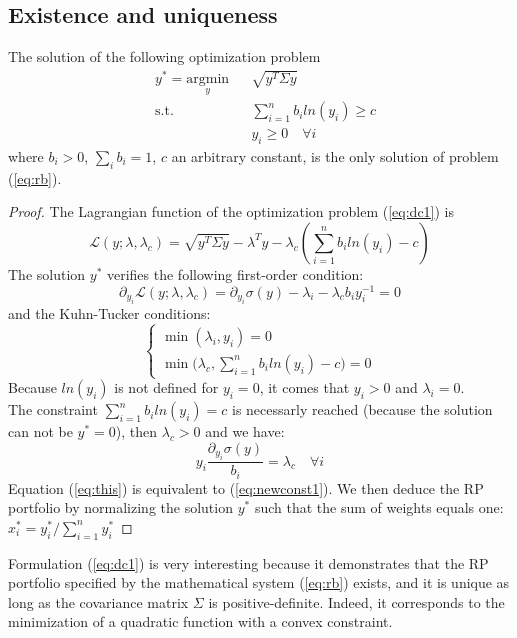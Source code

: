 \subsection{Existence and uniqueness}
\begin{theorem}
The solution of the following optimization problem
\begin{equation}\label{eq:dc1}
\begin{aligned}
& y^* = \underset{y}{\text{argmin}}
&& \sqrt{y^T \Sigma y}\\
& \text{s.t.}
&&\sum_{i=1}^n b_i ln(y_i) \geq c\\
&&&y_i \geq 0 \hspace{1em} \forall i
\end{aligned}
\end{equation}
where $b_i > 0$, $\sum_i b_i = 1$, $c$ an arbitrary constant, is the only solution of problem (\ref{eq:rb}).
\end{theorem} 
\begin{proof}
The Lagrangian function of the optimization problem (\ref{eq:dc1}) is
\begin{equation}
\mathcal{L}(y;\lambda,\lambda_c) = \sqrt{y^T \Sigma y} - \lambda^Ty - \lambda_c\left(\sum_{i=1}^n b_i ln(y_i) - c\right)
\end{equation}
The solution $y^*$ verifies the following first-order condition:
\begin{equation}
\partial_{y_i}\mathcal{L}(y;\lambda,\lambda_c) = \partial_{y_i}\sigma(y) - \lambda_i - \lambda_c b_i y_i^{-1} = 0
\end{equation}
and the Kuhn-Tucker conditions:
\begin{equation}
\begin{cases}
\min(\lambda_i,y_i)=0\\
\min\big(\lambda_c,\sum_{i=1}^n b_i ln(y_i) - c\big) = 0
\end{cases}
\end{equation}
Because $ln(y_i)$ is not defined for $y_i = 0$, it comes that $y_i > 0$ and $\lambda_i = 0$.\\
The constraint $\sum_{i=1}^n b_i ln(y_i) = c$ is necessarly reached (because the solution can not be $y^* = 0$), then $\lambda_c >0$ and we have:
\begin{equation}\label{eq:this}
y_i \frac{\partial_{y_i}\sigma(y)}{b_i}= \lambda_c \hspace{1em} \forall i
\end{equation}
Equation (\ref{eq:this}) is equivalent to (\ref{eq:newconst1}). We then deduce the RP portfolio by normalizing the solution $y^*$ such that the sum of weights equals one: $x_i^* =y_i^*/\sum_{i=1}^n y_i^*$
\end{proof}
Formulation (\ref{eq:dc1}) is very interesting because it demonstrates that the RP portfolio specified by the mathematical system (\ref{eq:rb}) exists, and it is unique as long as the covariance matrix $\Sigma$ is positive-definite. Indeed, it corresponds to the minimization of a quadratic function with a convex constraint.

